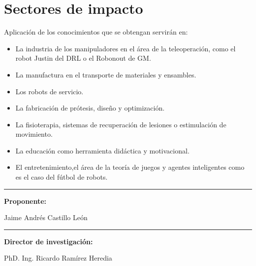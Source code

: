 \section[Impacto]{Sectores de impacto}
\label{sec:impacto}
Aplicaci\'on de los conocimientos que se obtengan servir\'an en: 
\begin{itemize}
\item La industria de los manipuladores en el \'area de la teleoperaci\'on, como el robot Justin del DRL o el Robonout de GM.
\item La manufactura en el transporte de materiales y ensambles.
\item Los robots de servicio.
\item La fabricaci\'on de prótesis, dise\~no y optimizaci\'on.
\item La fisioterapia, sistemas de recuperaci\'on de lesiones o estimulaci\'on de movimiento.
\item La educaci\'on como herramienta did\'actica y motivacional.
\item El entretenimiento,el área de la teor\'ia de juegos y agentes inteligentes como es el caso del fútbol de robots.
\end{itemize}

\vspace{2cm}

\vspace{4cm}
\parbox[b][3cm][c]{8cm}{
\centering
\rule{7cm}{1pt}\par
\textbf{Proponente:}\par
Jaime Andr\'es Castillo Le\'on
}\par\vspace{3cm}
\parbox[b][3cm][c]{8cm}{
\centering
\rule{7cm}{1pt}\par
\textbf{Director de investigaci\'on:}\par
PhD. Ing. Ricardo Ram\'irez Heredia
}


